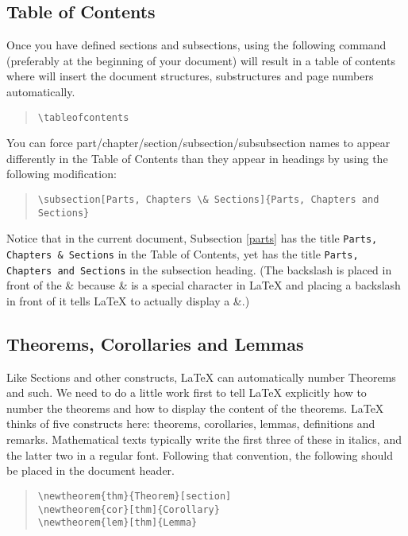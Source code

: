 \documentclass[letterpaper,twoside,10pt]{article}
\begin{document}
\subsection{Table of Contents}

Once you have defined sections and subsections, using the following command (preferably at the beginning of your document) will result in a table of contents where {\LaTeXe} will insert the document structures, substructures and page numbers automatically.

\begin{quote}
 \verb!\tableofcontents!
\end{quote}

You can force part/chapter/section/subsection/subsubsection names to appear differently in the Table of Contents than they appear in headings by using the following modification:

\begin{quote}
 \verb!\subsection[Parts, Chapters \& Sections]{Parts, Chapters and Sections}!
\end{quote}

Notice that in the current document, Subsection \ref{parts} has the title \texttt{Parts, Chapters \& Sections} in the Table of Contents, yet has the title \texttt{Parts, Chapters and Sections} in the subsection heading. (The backslash is placed in front of the \& because \& is a special character in {\LaTeX} and placing a backslash in front of it tells {\LaTeX} to actually display a \&.)

\subsection{Theorems, Corollaries and Lemmas}

Like Sections and other constructs, {\LaTeX} can automatically number Theorems and such. We need to do a little work first to tell {\LaTeX} explicitly how to number the theorems and how to display the content of the theorems. {\LaTeX} thinks of five constructs here: theorems, corollaries, lemmas, definitions and remarks. Mathematical texts typically write the first three of these in italics, and the latter two in a regular font. Following that convention, the following should be placed in the document header.

\begin{quote}
\begin{verbatim}
\newtheorem{thm}{Theorem}[section]
\newtheorem{cor}[thm]{Corollary}
\newtheorem{lem}[thm]{Lemma}
\end{verbatim}
\end{quote}
\end{document}
